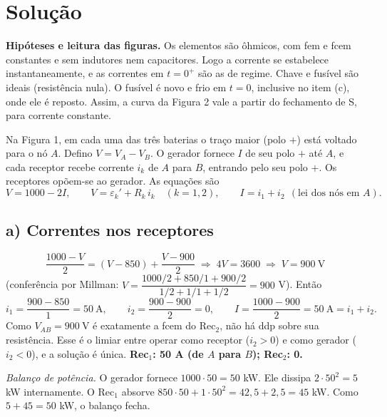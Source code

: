 \documentclass{article}%
\begin{document}
\section*{Solução}

\textbf{Hipóteses e leitura das figuras.} Os elementos são ôhmicos, com fem e fcem constantes e sem indutores nem capacitores. Logo a corrente se estabelece instantaneamente, e as correntes em $t=0^+$ são as de regime. Chave e fusível são ideais (resistência nula). O fusível é novo e frio em $t=0$, inclusive no item (c), onde ele é reposto. Assim, a curva da Figura 2 vale a partir do fechamento de S, para corrente constante.

Na Figura 1, em cada uma das três baterias o traço maior (polo $+$) está voltado para o nó $A$. Defino $V=V_A-V_B$. O gerador fornece $I$ de seu polo $+$ até $A$, e cada receptor recebe corrente $i_k$ de $A$ para $B$, entrando pelo seu polo $+$. Os receptores opõem-se ao gerador. As equações são
\[
V=1000-2I,\qquad V=\varepsilon_k'+R_k\,i_k\quad (k=1,2),\qquad I=i_1+i_2\ \ (\text{lei dos nós em }A).
\]

\subsection*{a) Correntes nos receptores}
\[
\frac{1000-V}{2}=(V-850)+\frac{V-900}{2}
\;\Longrightarrow\; 4V=3600
\;\Longrightarrow\; V=900\ \text{V}
\]
(conferência por Millman: $V=\dfrac{1000/2+850/1+900/2}{1/2+1/1+1/2}=900$ V). Então
\[
i_1=\frac{900-850}{1}=50\ \text{A},\qquad i_2=\frac{900-900}{2}=0,\qquad I=\frac{1000-900}{2}=50\ \text{A}=i_1+i_2 .
\]
Como $V_{AB}=900\ \text{V}$ é exatamente a fcem do Rec$_2$, não há ddp sobre sua resistência. Esse é o limiar entre operar como receptor ($i_2>0$) e como gerador ($i_2<0$), e a solução é única. \textbf{Rec$_1$: 50 A (de $A$ para $B$); Rec$_2$: 0.}

\emph{Balanço de potência.} O gerador fornece $1000\cdot 50=50$ kW. Ele dissipa $2\cdot 50^2=5$ kW internamente. O Rec$_1$ absorve $850\cdot50+1\cdot50^2=42{,}5+2{,}5=45$ kW. Como $5+45=50$ kW, o balanço fecha.
\end{document}
